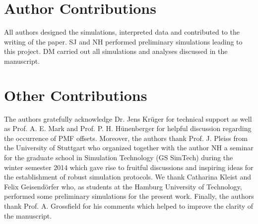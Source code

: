 \documentclass[9pt,lessons,pubversion]{livecoms}
\newcommand{\githubrepository}{\url{https://github.com/DanielMarkthaler/PMF_Artifacts_LessonsLearned_LiveCoMS}}  %
\begin{document}
\section{Author Contributions}
%

All authors designed the simulations, interpreted data and contributed to the writing of the paper. 
SJ and NH performed preliminary simulations leading to this project. DM carried out all simulations and analyses discussed in the manuscript.


\section{Other Contributions}
%

The authors gratefully acknowledge Dr. Jens Kr\"uger for technical support as well as Prof. A. E. Mark and Prof. P. H. H\"unenberger for helpful discussion regarding the occurrence of PMF offsets.
Moreover,  the authors thank  Prof. J. Pleiss from the University of Stuttgart who organized together with the author NH a seminar for the graduate school in Simulation Technology (GS SimTech)
during the winter semester 2014  which gave rise to fruitful discussions and inspiring ideas for the establishment of robust simulation protocols.
We thank Catharina Kleist and Felix Geisend\"orfer who, as students at the Hamburg University of Technology, performed some preliminary simulations for the present work.
Finally, the authors thank Prof. A. Grossfield for his comments which helped to improve the clarity of the manuscript.
\end{document}
